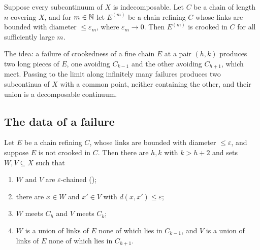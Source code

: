 \begin{theorem}[Bing 1951]\label{thm:eventually-crooked}
Suppose every subcontinuum of $X$ is indecomposable. Let $C$ be a chain of length $n$ covering $X$, and for $m\in\mathbb{N}$ let $E^{(m)}$ be a
chain refining $C$ whose links are bounded with diameter $\le\varepsilon_m$, where $\varepsilon_m\to0$. Then $E^{(m)}$ is crooked in $C$
for all sufficiently large $m$.
\end{theorem}


The idea: a failure of crookedness of a fine chain $E$ at a pair $(h,k)$ produces two long pieces of $E$, one avoiding $C_{k-1}$ and
the other avoiding $C_{h+1}$, which meet. Passing to the limit along infinitely many failures produces two subcontinua of $X$ with a
common point, neither containing the other, and their union is a decomposable continuum.

\subsection{The data of a failure}

\begin{lemma}\label{lem:fail-data}
Let $E$ be a chain refining $C$, whose links are bounded with diameter $\le\varepsilon$, and suppose $E$ is not crooked in $C$. Then
there are $h,k$ with $k>h+2$ and sets $W,V\subseteq X$ such that
\begin{enumerate}[label=(\alph*)]
\item $W$ and $V$ are $\varepsilon$-chained ();
\item there are $x\in W$ and $x'\in V$ with $d(x,x')\le\varepsilon$;
\item $W$ meets $C_h$ and $V$ meets $C_k$;
\item $W$ is a union of links of $E$ none of which lies in $C_{k-1}$, and $V$ is a union of links of $E$ none of which lies in $C_{h+1}$.
\end{enumerate}
\end{lemma}

